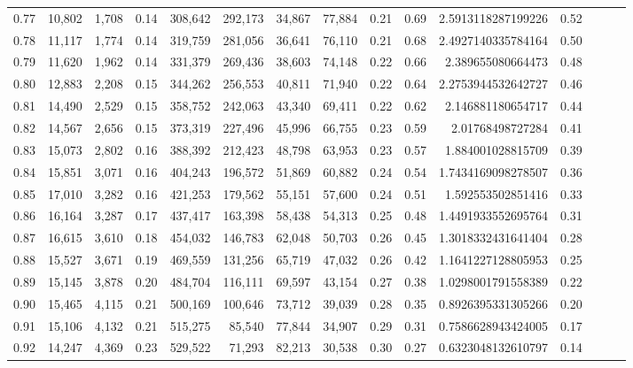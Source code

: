 \begin{tabular}{rrrrrrrrrrrrrrr}
0.77 &  10,802 &  1,708 &  0.14 &  308,642 &  292,173 &   34,867 &   77,884 &  0.21 &  0.69 &   2.5913118287199226 &      0.52 \\
0.78 &  11,117 &  1,774 &  0.14 &  319,759 &  281,056 &   36,641 &   76,110 &  0.21 &  0.68 &   2.4927140335784164 &      0.50 \\
0.79 &  11,620 &  1,962 &  0.14 &  331,379 &  269,436 &   38,603 &   74,148 &  0.22 &  0.66 &    2.389655080664473 &      0.48 \\
0.80 &  12,883 &  2,208 &  0.15 &  344,262 &  256,553 &   40,811 &   71,940 &  0.22 &  0.64 &   2.2753944532642727 &      0.46 \\
0.81 &  14,490 &  2,529 &  0.15 &  358,752 &  242,063 &   43,340 &   69,411 &  0.22 &  0.62 &    2.146881180654717 &      0.44 \\
0.82 &  14,567 &  2,656 &  0.15 &  373,319 &  227,496 &   45,996 &   66,755 &  0.23 &  0.59 &     2.01768498727284 &      0.41 \\
0.83 &  15,073 &  2,802 &  0.16 &  388,392 &  212,423 &   48,798 &   63,953 &  0.23 &  0.57 &    1.884001028815709 &      0.39 \\
0.84 &  15,851 &  3,071 &  0.16 &  404,243 &  196,572 &   51,869 &   60,882 &  0.24 &  0.54 &   1.7434169098278507 &      0.36 \\
0.85 &  17,010 &  3,282 &  0.16 &  421,253 &  179,562 &   55,151 &   57,600 &  0.24 &  0.51 &    1.592553502851416 &      0.33 \\
0.86 &  16,164 &  3,287 &  0.17 &  437,417 &  163,398 &   58,438 &   54,313 &  0.25 &  0.48 &   1.4491933552695764 &      0.31 \\
0.87 &  16,615 &  3,610 &  0.18 &  454,032 &  146,783 &   62,048 &   50,703 &  0.26 &  0.45 &   1.3018332431641404 &      0.28 \\
0.88 &  15,527 &  3,671 &  0.19 &  469,559 &  131,256 &   65,719 &   47,032 &  0.26 &  0.42 &   1.1641227128805953 &      0.25 \\
0.89 &  15,145 &  3,878 &  0.20 &  484,704 &  116,111 &   69,597 &   43,154 &  0.27 &  0.38 &   1.0298001791558389 &      0.22 \\
0.90 &  15,465 &  4,115 &  0.21 &  500,169 &  100,646 &   73,712 &   39,039 &  0.28 &  0.35 &   0.8926395331305266 &      0.20 \\
0.91 &  15,106 &  4,132 &  0.21 &  515,275 &   85,540 &   77,844 &   34,907 &  0.29 &  0.31 &   0.7586628943424005 &      0.17 \\
0.92 &  14,247 &  4,369 &  0.23 &  529,522 &   71,293 &   82,213 &   30,538 &  0.30 &  0.27 &   0.6323048132610797 &      0.14 \\

\end{tabular}
